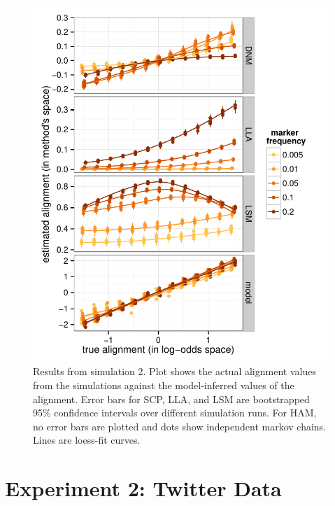 \documentclass{acm_proc_article-sp}
\begin{document}
\begin{figure}[t]
\centering
\includegraphics[width=\columnwidth]{graphics/www2016_simulation2b_crossiter.pdf}
\caption{Results from simulation 2. Plot shows the actual alignment values from the simulations against the model-inferred values of the alignment. Error bars for SCP, LLA, and LSM are bootstrapped 95\% confidence intervals over different simulation runs. For HAM, no error bars are plotted and dots show independent markov chains. Lines are loess-fit curves.}\label{fig:sim2}
\end{figure}




\section{Experiment 2: Twitter Data}
\end{document}
